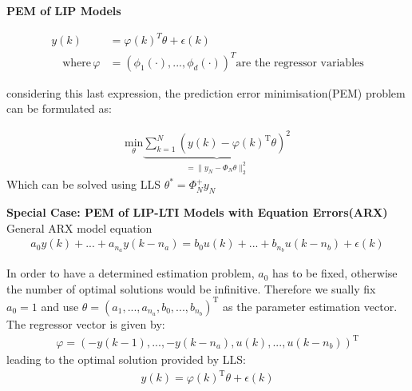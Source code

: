 \begin{tcolorbox}[colback=purple!5!white,colframe=purple!75!black,title=\textbf{Pure Output Error (OE) Minimization}]
	\textbf{PEM of LIP Models}
	
	\begin{align*}
	y(k) &= \varphi(k)^T\theta + \epsilon(k)\\
	\quad \text{where} \, \varphi &= (\phi_1(\cdot),... ,\phi_d(\cdot))^T \text{are the regressor variables}
	\end{align*}
	
	considering this last expression, the prediction error minimisation(PEM) problem can be formulated as:
	
	\begin{align*}
	\underset{\theta}{\text{min}} \underbrace{\sum_{k=1}^{N} (y(k)-\varphi(k)^\text{T} \theta)^2}_{= \parallel y_N - \Phi_N \theta \parallel_2^2}
	\end{align*}
	Which can be solved using LLS $\theta^* = \Phi^+_N y_N$
	
	\textbf{Special Case: PEM of LIP-LTI Models with Equation Errors(ARX)}
	General ARX model equation
	\begin{align*}
	a_0y(k)+...+a_{n_{a}}y(k-n_a) = b_0u(k)+...+b_{n_{b}}u(k-n_b)+\epsilon(k)
	\end{align*}
	
	In order to have a determined estimation problem, $a_0$ has to be fixed, otherwise the number of optimal solutions would be infinitive. Therefore we sually fix $a_0 = 1$ and use $\theta = (a_1, ..., a_{n_a}, b_0, ..., b_{n_b})^\text{T}$ as the parameter estimation vector. The regressor vector is given by:
	\begin{align*}
	\varphi = (-y(k-1), ..., -y(k-n_a), u(k), ..., u(k-n_b))^\text{T}
	\end{align*}
	leading to the optimal solution provided by LLS:
	\begin{align*}
	y(k) = \varphi(k)^\text{T} \theta + \epsilon(k)
	\end{align*}
	
\end{tcolorbox}
